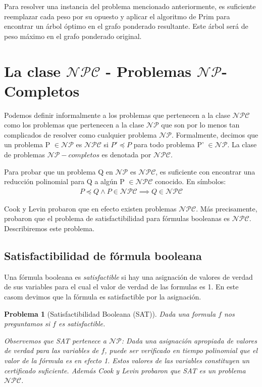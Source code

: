 \documentclass{article}
\newtheorem{problem}{Problema}
\begin{document}
Para resolver una instancia del problema mencionado anteriormente,
es suficiente reemplazar cada peso por su opuesto y aplicar el algoritmo
de Prim para encontrar un árbol óptimo en el grafo ponderado resultante.
Este árbol será de peso máximo en el grafo ponderado original.

\section*{La clase $\mathcal{NPC}$ - Problemas $\mathcal{NP}$-Completos}
Podemos definir informalmente a los problemas que pertenecen a la clase
$\mathcal{NPC}$ como los problemas que pertenecen a la clase $\mathcal{NP}$
que son por lo menos tan complicados de resolver como cualquier problema
$\mathcal{NP}$. Formalmente, decimos que un problema P $\in \mathcal{NP}$
es $\mathcal{NPC}$ si $P' \preceq P$ para todo problema P' $\in \mathcal{NP}$.
La clase de problemas $\mathcal{NP-}completos$ es denotada por $\mathcal{NPC}$.

Para probar que un problema Q en $\mathcal{NP}$ es $\mathcal{NPC}$,
es suficiente con encontrar una reducción polinomial para Q a algún P
$\in \mathcal{NPC}$ conocido. En símbolos:
\begin{align*}
    P \preceq Q \land P \in \mathcal{NPC} \implies Q\in   \mathcal{NPC}
\end{align*}

Cook y Levin probaron que en efecto existen problemas $\mathcal{NPC}$.
Más precisamente, probaron que el problema de satisfactibilidad para
fórmulas booleanas es $\mathcal{NPC}$. Describiremos este problema.

\subsection{Satisfactibilidad de fórmula booleana}
Una fórmula booleana es \textit{satisfactible} si hay una asignación
de valores de verdad de sus variables para el cual el valor de
verdad de las formulas es 1. En este casom devimos que la fórmula
es satisfactible por la asignación.

\begin{problem}[Satisfactibilidad Booleana (SAT)]
Dada una formula $f$ nos preguntamos si $f$ es satisfactible.

Observemos que SAT pertenece a $\mathcal{NP}$: Dada una asignación
apropiada de valores de verdad para las variables de $f$, puede
ser verificado en tiempo polinomial que el valor de la fórmula
es en efecto 1. Estos valores de las variables constituyen
un certificado suficiente. Además Cook y Levin probaron que
SAT es un problema $\mathcal{NPC}$.
\end{problem}
\end{document}
